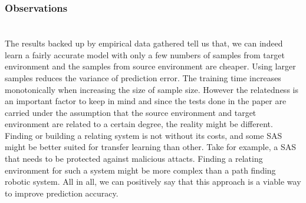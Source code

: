 \documentclass[pdftex,english,oribibl]{llncs}
\begin{document}
\subsubsection{Observations\\\\}
The results backed up by empirical data gathered tell us that, we can indeed learn a fairly accurate model with only a few numbers of samples from target environment and the samples from source environment are cheaper. Using larger samples reduces the variance of prediction error. The training time increases monotonically when increasing the size of sample size. However the relatedness is an important factor to keep in mind and since the tests done in the paper are carried under the assumption that the source environment and target environment are related to a certain degree, the reality might be different. Finding or building a relating system is not without its costs, and some SAS might be better suited for transfer learning than other. Take for example, a SAS that needs to be protected against malicious attacts. Finding a relating environment for such a system might be more complex than a path finding robotic system. All in all, we can positively say that this approach is a viable way to improve prediction accuracy.
\end{document}
